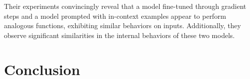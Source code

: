 \documentclass[11pt]{article}
\begin{document}
Their experiments convincingly reveal that a model fine-tuned through gradient steps and a model prompted with in-context examples appear to perform analogous functions, exhibiting similar behaviors on inputs.
Additionally, they observe significant similarities in the internal behaviors of these two models.



\section{Conclusion}


\nocite{rw1}
\nocite{rw2}




\newpage
\appendix
\end{document}
